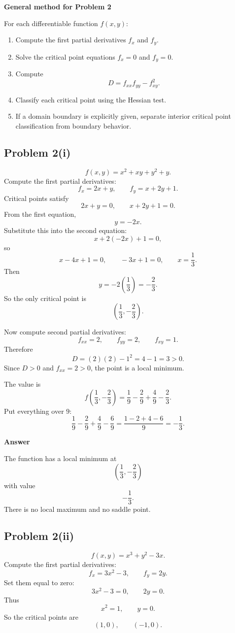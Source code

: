 \documentclass[11pt]{article}
\newenvironment{methodbox}[1]{\par\medskip\noindent\textcolor{lineblue}{\textbf{#1}}\par\smallskip}{\par\medskip}
\newenvironment{answerbox}[1]{\par\medskip\noindent\textcolor{linegreen}{\textbf{#1}}\par\smallskip}{\par\medskip}
\begin{document}
\begin{methodbox}{General method for Problem 2}
For each differentiable function $f(x,y)$:
\begin{enumerate}
\item Compute the first partial derivatives $f_x$ and $f_y$.
\item Solve the critical point equations $f_x=0$ and $f_y=0$.
\item Compute
\[
D=f_{xx}f_{yy}-f_{xy}^2.
\]
\item Classify each critical point using the Hessian test.
\item If a domain boundary is explicitly given, separate interior critical point classification from boundary behavior.
\end{enumerate}
\end{methodbox}

\subsection*{Problem 2(i)}
\[
f(x,y)=x^2+xy+y^2+y.
\]
Compute the first partial derivatives:
\[
f_x=2x+y,
\qquad
f_y=x+2y+1.
\]
Critical points satisfy
\[
2x+y=0,
\qquad x+2y+1=0.
\]
From the first equation,
\[
y=-2x.
\]
Substitute this into the second equation:
\[
x+2(-2x)+1=0,
\]
so
\[
x-4x+1=0,
\qquad -3x+1=0,
\qquad x=\frac13.
\]
Then
\[
y=-2\left(\frac13\right)=-\frac23.
\]
So the only critical point is
\[
\left(\frac13,-\frac23\right).
\]

Now compute second partial derivatives:
\[
f_{xx}=2,
\qquad f_{yy}=2,
\qquad f_{xy}=1.
\]
Therefore
\[
D=(2)(2)-1^2=4-1=3>0.
\]
Since $D>0$ and $f_{xx}=2>0$, the point is a local minimum.

The value is
\[
f\left(\frac13,-\frac23\right)
=\frac19-\frac29+\frac49-\frac23.
\]
Put everything over $9$:
\[
\frac19-\frac29+\frac49-\frac69
=\frac{1-2+4-6}{9}
=-\frac13.
\]

\begin{answerbox}{Answer}
The function has a local minimum at
\[
\left(\frac13,-\frac23\right)
\]
with value
\[
-\frac13.
\]
There is no local maximum and no saddle point.
\end{answerbox}

\subsection*{Problem 2(ii)}
\[
f(x,y)=x^3+y^2-3x.
\]
Compute the first partial derivatives:
\[
f_x=3x^2-3,
\qquad f_y=2y.
\]
Set them equal to zero:
\[
3x^2-3=0,
\qquad 2y=0.
\]
Thus
\[
x^2=1,
\qquad y=0.
\]
So the critical points are
\[
(1,0),
\qquad (-1,0).
\]
\end{document}
